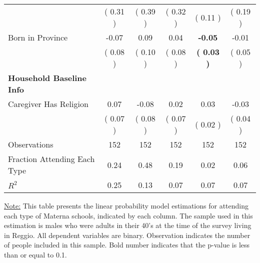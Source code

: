 \begin{table}[H]
{\begin{tabular}{lccccc}
\quad  & (     0.31 ) & (     0.39 )  & (     0.32 )  & (     0.11 ) & (     0.19 ) \\
\quad Born in Province &     -0.07 &      0.09 &      0.04 & \textbf{    -0.05} &     -0.01 \\
\quad  & (     0.08 ) & (     0.10 )  & (     0.08 )  & \textbf{(     0.03 )} & (     0.05 ) \\
\midrule
\textbf{Household Baseline Info} \\
\quad Caregiver Has Religion &      0.07 &     -0.08 &      0.02 &      0.03 &     -0.03 \\
\quad  & (     0.07 ) & (     0.08 )  & (     0.07 )  & (     0.02 ) & (     0.04 ) \\
\midrule
Observations & 152 & 152 & 152 & 152 & 152 \\
Fraction Attending Each Type &      0.24 &      0.48 &      0.19 &      0.02 &      0.06 \\
\midrule
$ R^2$ &      0.25 &      0.13 &      0.07 &      0.07 &      0.07 \\
\bottomrule
\end{tabular}}
\end{table}
\begin{footnotesize}
\noindent\underline{Note:} This table presents the linear probability model estimations for attending each type of Materna schools, indicated by each column. The sample used in this estimation is males who were adults in their 40's at the time of the survey living in Reggio. All dependent variables are binary. Observation indicates the number of people included in this sample. Bold number indicates that the p-value is less than or equal to 0.1.
\end{footnotesize}
